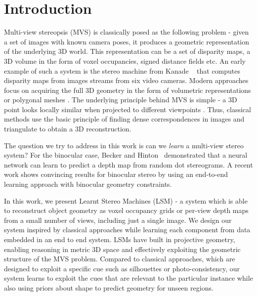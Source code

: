 \documentclass[../thesis.tex]{subfiles}
\begin{document}
%

\section{Introduction}

Multi-view stereopsis (MVS) is classically posed as the following problem - given a set of images with known camera poses, it produces a geometric representation of the underlying 3D world. This representation can be a set of disparity maps, a 3D volume in the form of voxel occupancies, signed distance fields etc. An early example of such a system is the stereo machine from Kanade \etal ~\cite{kanade1995development} that computes disparity maps from images streams from six video cameras. Modern approaches focus on acquiring the full 3D geometry in the form of volumetric representations or polygonal meshes \cite{seitz2006comparison}. The underlying principle behind MVS is simple - a 3D point looks locally similar when projected to different viewpoints \cite{kutulakos2000theory}. Thus, classical methods use the basic principle of finding dense correspondences in images and triangulate to obtain a 3D reconstruction.

The question we try to address in this work is can we \textit{learn} a multi-view stereo system? For the binocular case, Becker and Hinton~\cite{becker1992self} demonstrated that a neural network can learn to predict a depth map from random dot stereograms. A recent work \cite{kendall2017end} shows convincing results for binocular stereo by using an end-to-end learning approach with binocular geometry constraints.

In this work, we present Learnt Stereo Machines (LSM) - a system which is able to reconstruct object geometry as voxel occupancy grids or per-view depth maps from a small number of views, including just a single image. We design our system inspired by classical approaches while learning each component from data embedded in an end to end system. LSMs have built in projective geometry, enabling reasoning in metric 3D space and effectively exploiting the geometric structure of the MVS problem. Compared to classical approaches, which are designed to exploit a specific cue such as silhouettes or photo-consistency, our system learns to exploit the cues that are relevant to the particular instance while also using priors about shape to predict geometry for unseen regions.
\end{document}
